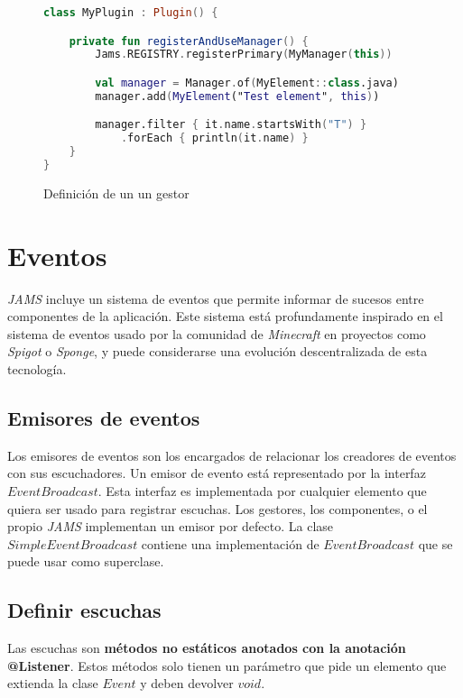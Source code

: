 \begin{figure}[h]
    \centering
    \begin{lstlisting}[frame=single,label={lst:manager-use},language=Kotlin]
class MyPlugin : Plugin() {

    private fun registerAndUseManager() {
        Jams.REGISTRY.registerPrimary(MyManager(this))

        val manager = Manager.of(MyElement::class.java)
        manager.add(MyElement("Test element", this))

        manager.filter { it.name.startsWith("T") }
            .forEach { println(it.name) }
    }
}
    \end{lstlisting}
    \caption{Definición de un un gestor}
    \label{fig:manager-use}
\end{figure}


\section{Eventos}\label{sec:eventos}

\textit{JAMS} incluye un sistema de eventos que permite informar de sucesos entre componentes de la aplicación.
Este sistema está profundamente inspirado en el sistema de eventos usado por la comunidad de \textit{Minecraft}
en proyectos como \textit{Spigot}\cite{SPIGOT}
o \textit{Sponge}\cite{SPONGE}, y puede considerarse una evolución descentralizada
de esta tecnología.

\subsection{Emisores de eventos}\label{subsec:emisores-de-eventos}

Los emisores de eventos son los encargados de relacionar los creadores de eventos con sus escuchadores.
Un emisor de evento está representado por la interfaz $EventBroadcast$.
Esta interfaz es implementada por cualquier elemento que quiera ser usado para registrar escuchas.
Los gestores, los componentes, o el propio \textit{JAMS} implementan un emisor por defecto.
La clase $SimpleEventBroadcast$ contiene una implementación de $EventBroadcast$
que se puede usar como superclase.

\subsection{Definir escuchas}\label{subsec:definir-escuchas}

Las escuchas son \textbf{métodos no estáticos anotados con la anotación @Listener}.
Estos métodos solo tienen un parámetro que pide un elemento que extienda la clase
$Event$ y deben devolver $void$.

